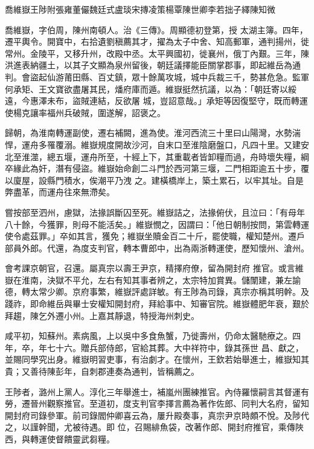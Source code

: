 
\begin{pinyinscope}

 喬維嶽王陟附張雍董儼魏廷式盧琰宋摶凌策楊覃陳世卿李若拙子繹陳知微



 喬維嶽，字伯周，陳州南頓人。治《三傳》。周顯德初登第，授
 太湖主簿。四年，遷平輿令。開寶中，右拾遺劉稹薦其才，擢為太子中舍、知高郵軍，通判揚州，徙常州。金陵平，又移升州，改殿中丞。太平興國初，徙襄州，俄丁內艱。三年，陳洪進表納疆土，以其子文顯為泉州留後，朝廷議擇能臣關掌郡事，即起維岳為通判。會盜起仙游莆田縣、百丈鎮，眾十餘萬攻城，城中兵裁三千，勢甚危急。監軍何承矩、王文寶欲盡屠其民，燔府庫而遁。維嶽挺然抗議，以為：「朝廷寄以綏遠，今惠澤未布，盜賊連結，反欲屠
 城，豈詔意哉。」承矩等因復堅守，既而轉運使楊克讓率福州兵破賊，圍遂解，詔褒之。



 歸朝，為淮南轉運副使，遷右補闕，進為使。淮河西流三十里曰山陽灣，水勢湍悍，運舟多罹覆溺。維嶽規度開故沙河，自末口至淮陰磨盤口，凡四十里。又建安北至淮澨，總五堰，運舟所至，十經上下，其重載者皆卸糧而過，舟時壞失糧，綱卒緣此為奸，潛有侵盜。維嶽始命創二斗門於西河第三堰，二門相距逾五十步，覆以廈屋，設縣門積水，俟潮平乃洩
 之。建橫橋岸上，築土累石，以牢其址。自是弊盡革，而運舟往來無滯矣。



 嘗按部至泗州，慮獄，法掾誤斷囚至死。維嶽詰之，法掾俯伏，且泣曰：「有母年八十餘，今獲罪，則母不能活矣。」維嶽憫之，因謂曰：「他日朝制按問，第雲轉運使令處茲罪。」卒如其言，獲免；維嶽坐贖金百二十斤，罷使職，權知楚州。遷戶部員外郎。代還，為度支判官，轉本曹郎中，出為兩浙轉運使，歷知懷州、滄州。



 會考課京朝官，召還。屬真宗以壽王尹京，精擇府僚，留為開封府
 推官。或言維嶽在淮南，決獄不平允，左右有知其事者辨之，太宗特加賞異。儲闈建，兼左諭德，轉太常少卿。京府事繁，維嶽評處詳敏。有王陟為司錄，真宗亦稱其明幹。及踐祚，即命維岳與畢士安權知開封府，拜給事中、知審官院。維嶽體肥年衰，艱於拜趨，陳乞外遷小州。上嘉其靜退，特授海州刺史。



 咸平初，知蘇州。素病風，上以吳中多食魚蟹，乃徙壽州，仍命太醫馳療之。四年，卒，年七十六。贈兵部侍郎，官給其葬。大中祥符中，錄其孫世
 昌、獻之，並賜同學究出身。維嶽明習吏事，有治劇才。在懷州，王欽若始舉進士，維嶽知其貴；又善待陳彭年，自刺郡連奏為通判，皆稱薦之。



 王陟者，潞州上黨人。淳化三年舉進士，補嵐州團練推官。內侍羅懷嗣言其督運有勞，遷晉州觀察推官。至道初，度支判官李擇言薦為著作佐郎、同判大名府，留知開封府司錄參軍。前司錄閻仲卿喜云為，屢升殿奏事，真宗尹京時頗不悅。及陟代之，以謹幹聞，尤被待遇。即
 位，召賜緋魚袋，改著作郎、開封府推官，乘傳陜西，與轉運使督饋靈武芻糧。




\end{pinyinscope}
